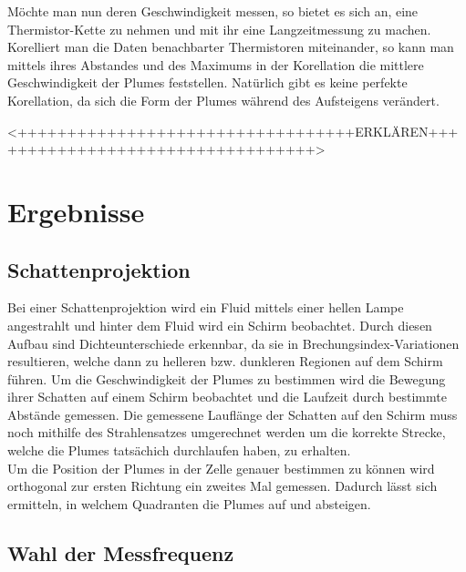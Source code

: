 \documentclass[12pt,a4paper,titlepage,headinclude]{scrartcl}
\numberwithin{equation}{subsection}
\begin{document}
Möchte man nun deren Geschwindigkeit messen, so bietet es sich an, eine Thermistor-Kette zu nehmen und mit ihr eine Langzeitmessung zu machen.
Korelliert man die Daten benachbarter Thermistoren miteinander, so kann man mittels ihres Abstandes und des Maximums in der Korellation die mittlere Geschwindigkeit der Plumes feststellen.
Natürlich gibt es keine perfekte Korellation, da sich die Form der Plumes während des Aufsteigens verändert.

<++++++++++++++++++++++++++++++++++ERKLÄREN++++++++++++++++++++++++++++++++++>

\newpage
\section{Ergebnisse}
\label{sec:auswertung}

\subsection{Schattenprojektion}
\label{sec:schatte}
Bei einer Schattenprojektion wird ein Fluid mittels einer hellen Lampe angestrahlt und hinter dem Fluid wird ein Schirm beobachtet.
Durch diesen Aufbau sind Dichteunterschiede erkennbar, da sie in Brechungsindex-Variationen resultieren, welche dann zu helleren bzw. dunkleren Regionen auf dem Schirm führen.
Um die Geschwindigkeit der Plumes zu bestimmen wird die Bewegung ihrer Schatten auf einem Schirm beobachtet und die Laufzeit durch bestimmte Abstände gemessen.
Die gemessene Lauflänge der Schatten auf den Schirm muss noch mithilfe des Strahlensatzes umgerechnet werden um die korrekte Strecke, welche die Plumes tatsächich durchlaufen haben, zu erhalten.\\

Um die Position der Plumes in der Zelle genauer bestimmen zu können wird orthogonal zur ersten Richtung ein zweites Mal gemessen.
Dadurch lässt sich ermitteln, in welchem Quadranten die Plumes auf und absteigen.
\\



\subsection{Wahl der Messfrequenz}
\end{document}
